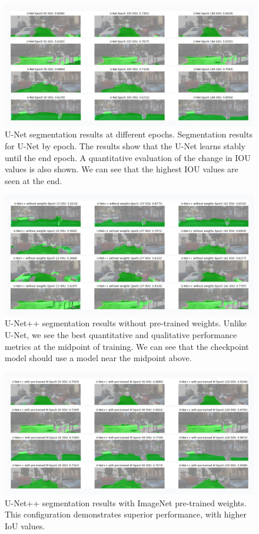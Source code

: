 \documentclass[10pt,twocolumn,letterpaper,final]{article} %
\begin{document}
\begin{figure}[H]
    \centering
    \includegraphics[width=\linewidth]{unet.png}
    \caption{U-Net segmentation results at different epochs. Segmentation results for U-Net by epoch. The results show that the U-Net learns stably until the end epoch. A quantitative evaluation of the change in IOU values is also shown.
 We can see that the highest IOU values are seen at the end.}
    \label{fig:unet_results}
\end{figure}

\begin{figure}[H]
    \centering
    \includegraphics[width=\linewidth]{unet++no.png}
    \caption{U-Net++ segmentation results without pre-trained weights. Unlike U-Net, we see the best quantitative and qualitative performance metrics at the midpoint of training. We can see that the checkpoint model should use a model near the midpoint above.}
    \label{fig:unet++_no_weights}
\end{figure}

\begin{figure}[H]
    \centering
    \includegraphics[width=\linewidth]{unet++yes.png}
    \caption{U-Net++ segmentation results with ImageNet pre-trained weights. This configuration demonstrates superior performance, with higher IoU values. }
    \label{fig:unet++_with_weights}
\end{figure}
\end{document}

